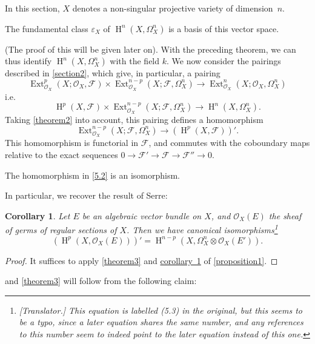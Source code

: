 \documentclass{article}
\theoremstyle{plain}
\newenvironment{theorem}[1]
    {\renewcommand\theinnercustomtheorem{#1}\innercustomtheorem}
    {\endinnercustomtheorem}
\newtheorem*{corollary*}{Corollary}
\theoremstyle{definition}
\newcommand{\sh}{\mathscr}
\DeclareMathOperator{\Ext}{Ext}
\DeclareMathOperator{\HH}{H}
\newcommand{\oldpage}[1]{\marginpar{\footnotesize$\Big\vert$ \textit{p.~#1}}}
\begin{document}
In this section, $X$ denotes a non-singular projective variety of dimension~$n$.

\begin{theorem}{2}
\label{theorem2}
  The fundamental class $\varepsilon_X$ of $\HH^n(X,\Omega_X^n)$ is a basis of this vector space.
\end{theorem}

(The proof of this will be given later on).
With the preceding theorem, we can thus identify $\HH^n(X,\Omega_X^n)$ with the field $k$.
We now consider the pairings described in \cref{section2}, which give, in particular, a pairing
\oldpage{149-14}
\[
  \Ext_{\sh{O}_X}^p(X;\sh{O}_X,\sh{F})\times\Ext_{\sh{O}_X}^{n-p}(X;\sh{F},\Omega_X^n) \to \Ext_{\sh{O}_X}^n(X;\sh{O}_X,\Omega_X^n)
\]
i.e.
\[
\label{5.1}
  \HH^p(X,\sh{F})\times\Ext_{\sh{O}_X}^{n-p}(X;\sh{F},\Omega_X^n) \to \HH^n(X,\Omega_X^n).
\tag{5.1}
\]
Taking \cref{theorem2} into account, this pairing defines a homomorphism
\[
\label{5.2}
  \Ext_{\sh{O}_X}^{n-p}(X;\sh{F},\Omega_X^n) \to (\HH^p(X,\sh{F}))'.
\tag{5.2}
\]
This homomorphism is functorial in $\sh{F}$, and commutes with the coboundary maps relative to the exact sequences $0\to\sh{F}'\to\sh{F}\to\sh{F}''\to0$.

\begin{theorem}{3}
\label{theorem3}
  The homomorphism in \cref{5.2} is an isomorphism.
\end{theorem}

In particular, we recover the result of Serre:

\begin{corollary*}
\label{theorem3corollary}
  \renewcommand*{\thefootnote}{\fnsymbol{footnote}}
  Let $E$ be an algebraic vector bundle on $X$, and $\sh{O}_X(E)$ the sheaf of germs of regular sections of $X$.
  Then we have canonical isomorphisms\footnote{\emph{[Translator.] This equation is labelled (5.3) in the original, but this seems to be a typo, since a later equation shares the same number, and any references to this number seem to indeed point to the later equation instead of this one.}}
  \[
    (\HH^p(X,\sh{O}_X(E)))' = \HH^{n-p}(X,\Omega_X^n\otimes\sh{O}_X(E')).
  \]
\end{corollary*}

\begin{proof}
  It suffices to apply \cref{theorem3} and \hyperref[proposition1corollary1]{corollary~1} of \cref{proposition1}.
\end{proof}

 and \cref{theorem3} will follow from the following claim:
\end{document}
